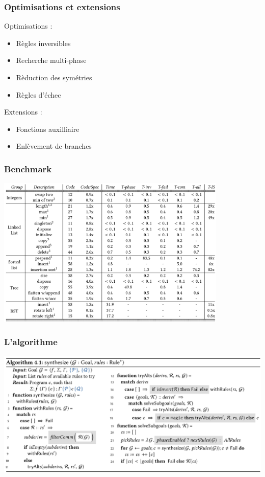 \documentclass[french]{beamer}
\begin{document}
\begin{frame}[fragile]
	\frametitle{Optimisations et extensions}
	Optimisations :
	\begin{itemize}
		\item Règles inversibles
		\pause
		\item Recherche multi-phase
		\pause
		\item Rèduction des symétries
		\pause
		\item Règles d'échec 
	\end{itemize}
	\pause
	Extensions :
	\begin{itemize}
	\item Fonctions auxilliaire
	\pause
	\item Enlèvement de branches	
	\end{itemize}
\end{frame}
\begin{frame}
	\frametitle{Benchmark}
	\includegraphics[width=11cm]{figures/benchmark.png}
\end{frame}
\begin{frame}
   \frametitle{L'algorithme}
   \includegraphics[width=\linewidth]{figures/algorithm.png}
\end{frame}
\end{document}
